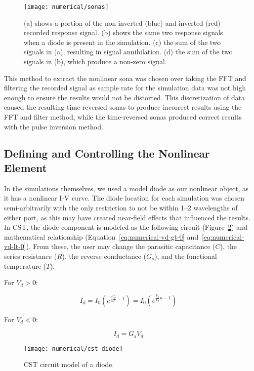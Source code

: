 \begin{figure}[t]
\centering
\texttt{[image: numerical/sonas]}
\caption[Demonstration of pulse inversion]{(a) shows a portion of the non-inverted (blue) and inverted (red) recorded response signal. (b) shows the same two response signals when a diode is present in the simulation. (c) the sum of the two signals in (a), resulting in signal annihilation. (d) the sum of the two signals in (b), which produce a non-zero signal.}
\label{fig:numerical-sonas}
\end{figure}
This method to extract the nonlinear sona was chosen over taking the FFT and filtering the recorded signal as sample rate for the simulation data was not high enough to ensure the results would not be distorted. This discretization of data caused the resulting time-reversed sonas to produce incorrect results using the FFT and filter method, while the time-reversed sonas produced correct results with the pulse inversion method.
\subsection{Defining and Controlling the Nonlinear Element}
In the simulations themselves, we used a model diode as our nonlinear object, as it has a nonlinear I-V curve. The diode location for each simulation was chosen semi-arbitrarily with the only restriction to not be within \numrange{1}{2} wavelengths of either port, as this may have created near-field effects that influenced the results. In CST, the diode component is modeled as the following circuit (Figure~\ref{fig:numerical-cst-diode}) and mathematical relationship (Equation~\ref{eq:numerical-vd-gt-0} and~\ref{eq:numerical-vd-lt-0}). From these, the user may change the parasitic capacitance ($C$), the series resistance ($R$), the reverse conductance ($G_{s}$), and the functional temperature ($T$).

For $V_d > 0$:

\begin{equation}
I_d = I_0\left( e^{\frac{eV_{d}}{kT}-1}\right) = I_0\left( e^{\frac{V_{d}}{V_{k}}a - 1}\right)
\label{eq:numerical-vd-gt-0}
\end{equation}

For $V_d < 0$:

\begin{equation}
I_{d} = G_{s}V_{d}
\label{eq:numerical-vd-lt-0}
\end{equation}

\begin{figure}[t]
\centering
\texttt{[image: numerical/cst-diode]}
\caption[CST circuit model of a diode]{CST circuit model of a diode.}
\label{fig:numerical-cst-diode}
\end{figure}

